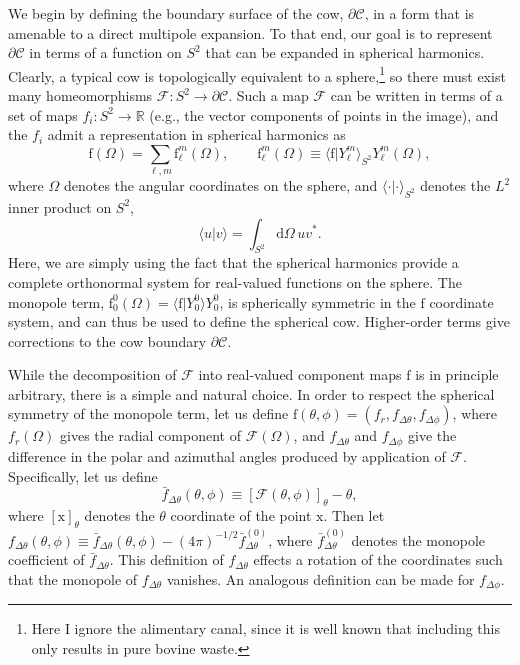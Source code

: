 \documentclass[
    prd, twocolumn, nofootinbib, amsmath, amssymb,
    aps, floatfix, preprintnumbers
]{revtex4-2}
\newcommand{\bb}[1]{\bm{\mathrm{#1}}}
\newcommand{\du}{\mathrm{d}}
\begin{document}
We begin by defining the boundary surface of the cow, $\partial\mathcal C$, in a form that is amenable to a direct multipole expansion. To that end, our goal is to represent $\partial\mathcal C$ in terms of a function on $S^2$ that can be expanded in spherical harmonics. Clearly, a typical cow is topologically equivalent to a sphere,\footnote{Here I ignore the alimentary canal, since it is well known that including this only results in pure bovine waste.} so there must exist many homeomorphisms $\mathcal F\colon S^2\to\partial\mathcal C$. Such a map $\mathcal F$ can be written in terms of a set of maps $f_i\colon S^2\to\mathbb R$ (e.g., the vector components of points in the image), and the $f_i$ admit a representation in spherical harmonics as 
\begin{equation}
    \bb f(\Omega) = \sum_{\ell, m} \bb f_\ell^m(\Omega),
    \qquad
    \bb f_\ell^m(\Omega)\equiv
        \langle \bb f|Y_\ell^m\rangle_{S^2} Y_\ell^m(\Omega)
    ,
\end{equation}
where $\Omega$ denotes the angular coordinates on the sphere, and $\langle\cdot|\cdot\rangle_{S^2}$ denotes the $L^2$ inner product on $S^2$,
\begin{equation}
    \langle u | v\rangle = \int_{S^2}\du\Omega\,uv^*
    .
\end{equation}
Here, we are simply using the fact that the spherical harmonics provide a complete orthonormal system for real-valued functions on the sphere. The monopole term, $\bb f_0^0(\Omega) = \langle \bb f |Y_0^0\rangle Y_0^0$, is spherically symmetric in the $\bb f$ coordinate system, and can thus be used to define the spherical cow. Higher-order terms give corrections to the cow boundary $\partial\mathcal C$.

While the decomposition of $\mathcal F$ into real-valued component maps $\bb f$ is in principle arbitrary, there is a simple and natural choice. In order to respect the spherical symmetry of the monopole term, let us define $\bb f(\theta, \phi) = (f_r, f_{\Delta\theta}, f_{\Delta\phi})$, where $f_r(\Omega)$ gives the radial component of $\mathcal F(\Omega)$, and $f_{\Delta\theta}$ and $f_{\Delta\phi}$ give the difference in the polar and azimuthal angles produced by application of $\mathcal F$. Specifically, let us define
\begin{equation}
    \bar{f}_{\Delta\theta}(\theta, \phi) \equiv
        [\mathcal F(\theta, \phi)]_\theta - \theta,
\end{equation}
where $[\bb x]_\theta$ denotes the $\theta$ coordinate of the point $\bb x$. Then let $f_{\Delta\theta}(\theta,\phi) \equiv \bar{f}_{\Delta\theta}(\theta,\phi) - (4\pi)^{-1/2}\bar{f}_{\Delta\theta}^{(0)}$, where $\bar{f}_{\Delta\theta}^{(0)}$ denotes the monopole coefficient of $\bar{f}_{\Delta\theta}$. This definition of $f_{\Delta\theta}$ effects a rotation of the coordinates such that the monopole of $f_{\Delta\theta}$ vanishes. An analogous definition can be made for $f_{\Delta\phi}$.
\end{document}

